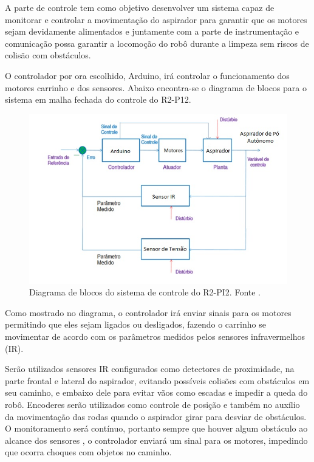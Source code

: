 			A parte de controle tem como objetivo desenvolver um sistema capaz de monitorar e controlar a movimentação do aspirador para garantir que os motores sejam devidamente alimentados e juntamente com a parte de instrumentação e comunicação possa garantir a locomoção do robô durante a limpeza sem riscos de colisão com obstáculos.

			O controlador por ora escolhido, Arduino, irá controlar o funcionamento dos motores carrinho e dos sensores. Abaixo encontra-se o diagrama de blocos para o sistema em malha fechada do controle do R2-P12.

			\begin{figure}[H]
				\centering
				\includegraphics[scale=0.55]{figuras/diagrama_blocos_R2PI2.png}
				\caption{Diagrama de blocos do sistema de controle do R2-PI2. Fonte \cite{mello}.}
				\label{img:diagrama_sistema_controle}
			\end{figure}

			Como mostrado no diagrama, o controlador irá enviar sinais para os motores permitindo que eles sejam ligados ou desligados, fazendo o carrinho se movimentar de acordo com os parâmetros medidos pelos sensores infravermelhos (IR). 

			Serão utilizados sensores IR configurados como detectores de proximidade, na parte frontal  e lateral do aspirador, evitando possíveis colisões com obstáculos em seu caminho, e embaixo dele para evitar vãos como escadas e impedir a queda do robô. Encoderes serão utilizados como controle de posição e também no auxílio da movimentação das rodas quando o aspirador girar para desviar de obstáculos. O monitoramento será contínuo, portanto sempre que houver algum obstáculo ao alcance dos sensores , o controlador enviará um sinal para os motores, impedindo que ocorra choques com objetos no caminho. 

